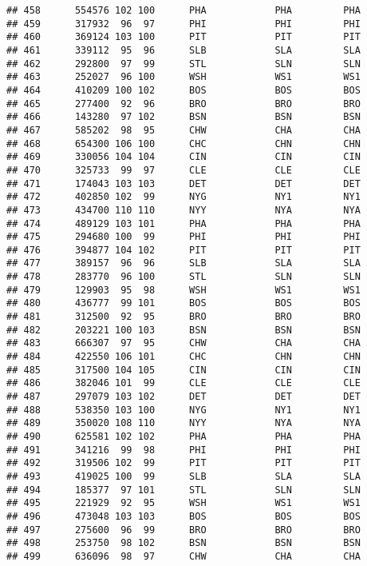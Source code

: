 \documentclass[]{article}
\begin{document}
\begin{verbatim}
## 458      554576 102 100      PHA            PHA         PHA
## 459      317932  96  97      PHI            PHI         PHI
## 460      369124 103 100      PIT            PIT         PIT
## 461      339112  95  96      SLB            SLA         SLA
## 462      292800  97  99      STL            SLN         SLN
## 463      252027  96 100      WSH            WS1         WS1
## 464      410209 100 102      BOS            BOS         BOS
## 465      277400  92  96      BRO            BRO         BRO
## 466      143280  97 102      BSN            BSN         BSN
## 467      585202  98  95      CHW            CHA         CHA
## 468      654300 106 100      CHC            CHN         CHN
## 469      330056 104 104      CIN            CIN         CIN
## 470      325733  99  97      CLE            CLE         CLE
## 471      174043 103 103      DET            DET         DET
## 472      402850 102  99      NYG            NY1         NY1
## 473      434700 110 110      NYY            NYA         NYA
## 474      489129 103 101      PHA            PHA         PHA
## 475      294680 100  99      PHI            PHI         PHI
## 476      394877 104 102      PIT            PIT         PIT
## 477      389157  96  96      SLB            SLA         SLA
## 478      283770  96 100      STL            SLN         SLN
## 479      129903  95  98      WSH            WS1         WS1
## 480      436777  99 101      BOS            BOS         BOS
## 481      312500  92  95      BRO            BRO         BRO
## 482      203221 100 103      BSN            BSN         BSN
## 483      666307  97  95      CHW            CHA         CHA
## 484      422550 106 101      CHC            CHN         CHN
## 485      317500 104 105      CIN            CIN         CIN
## 486      382046 101  99      CLE            CLE         CLE
## 487      297079 103 102      DET            DET         DET
## 488      538350 103 100      NYG            NY1         NY1
## 489      350020 108 110      NYY            NYA         NYA
## 490      625581 102 102      PHA            PHA         PHA
## 491      341216  99  98      PHI            PHI         PHI
## 492      319506 102  99      PIT            PIT         PIT
## 493      419025 100  99      SLB            SLA         SLA
## 494      185377  97 101      STL            SLN         SLN
## 495      221929  92  95      WSH            WS1         WS1
## 496      473048 103 103      BOS            BOS         BOS
## 497      275600  96  99      BRO            BRO         BRO
## 498      253750  98 102      BSN            BSN         BSN
## 499      636096  98  97      CHW            CHA         CHA

\end{verbatim}
\end{document}
